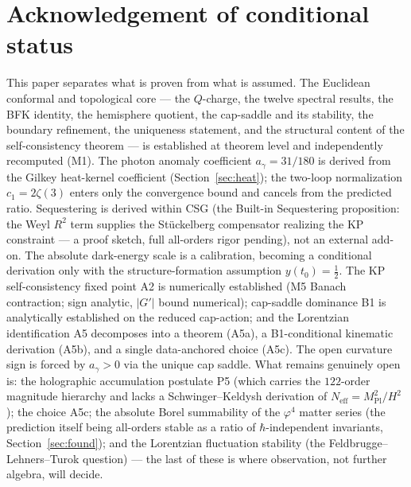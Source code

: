 \documentclass[11pt,a4paper]{article}
\theoremstyle{plain}
\theoremstyle{definition}
\theoremstyle{remark}
\newcommand{\ag}{a_\gamma}
\newcommand{\Mpl}{M_{\mathrm{Pl}}}
\begin{document}
\section*{Acknowledgement of conditional status}
This paper separates what is proven from what is assumed. The Euclidean conformal and
topological core --- the $Q$-charge, the twelve spectral results, the BFK identity, the
hemisphere quotient, the cap-saddle and its stability, the boundary refinement, the uniqueness
statement, and the structural content of the self-consistency theorem --- is established at
theorem level and independently recomputed (M1). The photon anomaly coefficient $\ag = 31/180$ is
derived from the Gilkey heat-kernel coefficient (Section~\ref{sec:heat}); the two-loop
normalization $c_1 = 2\zeta(3)$ enters only the convergence bound and cancels from the predicted
ratio. Sequestering is derived within CSG (the Built-in Sequestering proposition: the Weyl
$R^2$ term supplies the Stückelberg compensator realizing the KP constraint --- a proof sketch,
full all-orders rigor pending), not an external add-on. The absolute dark-energy
scale is a calibration, becoming a conditional derivation only with the structure-formation
assumption $y(t_0)=\tfrac12$. The KP self-consistency fixed point A2 is numerically established (M5 Banach
contraction; sign analytic, $|G'|$ bound numerical); cap-saddle dominance B1 is analytically established on the reduced cap-action; and
the Lorentzian identification A5 decomposes into a theorem (A5a), a B1-conditional kinematic
derivation (A5b), and a single data-anchored choice (A5c). The open curvature sign is forced by
$\ag>0$ via the unique cap saddle. What remains genuinely open is: the holographic accumulation
postulate P5 (which carries the $122$-order magnitude hierarchy and lacks a Schwinger--Keldysh
derivation of $N_{\mathrm{eff}} = \Mpl^2/H^2$); the choice A5c; the absolute Borel summability of
the $\varphi^4$ matter series (the prediction itself being all-orders stable as a ratio of
$\hbar$-independent invariants, Section~\ref{sec:found}); and the Lorentzian
fluctuation stability (the Feldbrugge--Lehners--Turok question) --- the last of these is where
observation, not further algebra, will decide.
\end{document}
